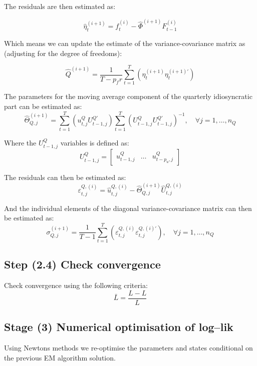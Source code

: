 \documentclass[12pt]{article}
\begin{document}
\begin{appendices}
The residuals are then estimated as:

\begin{equation*}
\widehat{\eta}_{t}^{(i+1)} = f_{t}^{(i)} - \widehat{\Phi}^{(i+1)} F_{t-1}^{(i)}
\end{equation*}

Which means we can update the estimate of the variance-covariance matrix as (adjusting for the degree of freedoms):

\begin{equation*}
\widehat{Q}^{(i+1)} = \frac{1}{T - p_{f} r}\sum_{t=1}^{T} \left(\eta_{t}^{(i+1)}\eta_{t}^{(i+1)'}\right)
\end{equation*}


The parameters for the moving average component of the quarterly idiosyncratic part can be estimated as:
\begin{equation*}
\widehat{\Theta}_{Q,j}^{(i+1)} = 
\sum_{t=1}^{T} \left(u_{t,j}^{Q}U_{t-1,j}^{Q'}\right)
\sum_{t=1}^{T} \left(U_{t-1,j}^{Q} U_{t-1,j}^{Q'}\right)^{-1}, 
\quad \forall j = 1, \dots, n_{Q}
\end{equation*}

Where the $U_{t-1,j}^{Q}$ variables is defined as:
\begin{equation*}
U_{t-1,j}^{Q} =
\begin{bmatrix}
u_{t-1,j}^{Q} & \dots & u_{t-p_{u},j}^{Q}
\end{bmatrix}
\end{equation*}

The residuals can then be estimated as:
\begin{equation*}
\varepsilon_{t,j}^{Q,(i)} = \widehat{u}_{t,j}^{Q,(i)} - \widehat{\Theta}_{Q,j}^{(i+1)} \widehat{U}_{t,j}^{Q,(i)}
\end{equation*}

And the individual elements of the diagonal variance-covariance matrix can then be estimated as:
\begin{equation*}
\sigma_{Q,j}^{(i+1)} = 
\frac{1}{T - 1}\sum_{t=1}^{T}\left(	\varepsilon_{t,j}^{Q,(i)} 	\varepsilon_{t,j}^{Q,(i)'} \right),
\quad \forall j = 1,\dots,n_{Q}
\end{equation*}

\subsection{Step (2.4) Check convergence}	
Check convergence using the following criteria:
\begin{equation*}
\bar{L} = \frac{L-L}{L}
\end{equation*}





\subsection{Stage (3) Numerical optimisation of log--lik}

Using Newtons methods we re-optimise the parameters and states conditional on the previous EM algorithm solution.

\end{appendices}
\end{document}
